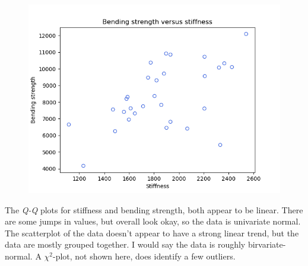 \begin{enumerate}[label= (\alph*)]
    \begin{figure}[H]
        \centering
        \includegraphics[scale=0.55]{./python/chapter-5/Question-5-19-c-xy.png}
    \end{figure}
\end{enumerate}

The \textit{Q-Q} plots for stiffness and bending strength, both appear to be linear. There are some jumps in values, but overall look okay, so the data is univariate normal. The scatterplot of the data doesn't appear to have a strong linear trend, but the data are mostly grouped together. I would say the data is roughly birvariate-normal. A $\chi^{2}$-plot, not shown here, does identify a few outliers.